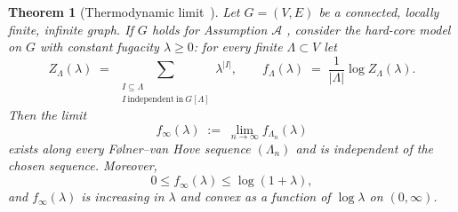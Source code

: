 \documentclass[a4paper,11pt]{article}
\theoremstyle{plain}
\newtheorem{theorem}{Theorem}[section]
\theoremstyle{definition}
\theoremstyle{remark}
\newcommand{\1}{\mathbf{1}}
\begin{document}
\begin{theorem}[Thermodynamic limit~\cite{scott2005repulsive}]\label{thm:thermodynamic_limit_periodic_graph}
Let $G=(V,E)$ be a connected, locally finite, infinite graph.
If $G$ holds for \textit{Assumption $\mathcal{A}$}
, consider the hard-core model on $G$ with constant fugacity $\lambda\ge 0$: for every finite
$\Lambda\subset V$ let
\[
Z_\Lambda(\lambda)\;=\;\sum_{\substack{I\subseteq \Lambda\\ I\ \mathrm{independent\ in}\ G[\Lambda]}}
\lambda^{|I|},
\qquad
f_\Lambda(\lambda)\;=\;\frac{1}{|\Lambda|}\log Z_\Lambda(\lambda).
\]
Then the limit
\[
f_\infty(\lambda)\;:=\;\lim_{n\to\infty} f_{\Lambda_n}(\lambda)
\]
exists along every F\o lner--van Hove sequence $(\Lambda_n)$ and is independent of the chosen sequence.
Moreover,
\[
0\le f_\infty(\lambda)\le \log(1+\lambda),
\]
and $f_\infty(\lambda)$ is increasing in $\lambda$ and convex as a function of $\log\lambda$ on $(0,\infty)$.
\end{theorem}
\end{document}
